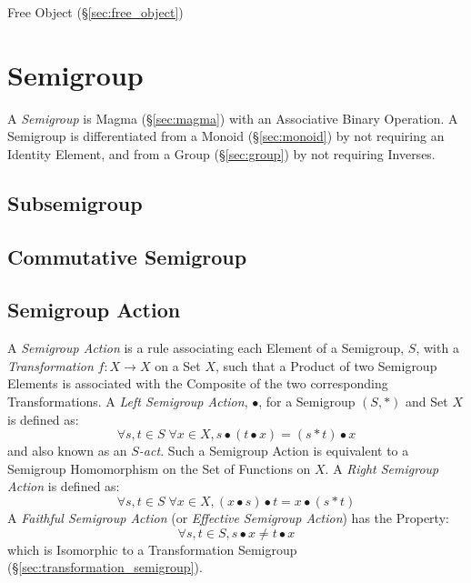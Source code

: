 Free Object (\S\ref{sec:free_object})



\section{Semigroup}\label{sec:semigroup}

A \emph{Semigroup} is Magma (\S\ref{sec:magma}) with an Associative
Binary Operation. A Semigroup is differentiated from a Monoid
(\S\ref{sec:monoid}) by not requiring an Identity Element, and from
a Group (\S\ref{sec:group}) by not requiring Inverses.



\subsection{Subsemigroup}\label{sec:subsemigroup}

\subsection{Commutative Semigroup}\label{sec:commutative_semigroup}

\subsection{Semigroup Action}\label{sec:semigroup_action}

A \emph{Semigroup Action} is a rule associating each Element of a
Semigroup, $S$, with a \emph{Transformation} $f : X \rightarrow X$ on
a Set $X$, such that a Product of two Semigroup Elements is associated
with the Composite of the two corresponding Transformations. A
\emph{Left Semigroup Action}, $\bullet$, for a Semigroup $(S,*)$ and
Set $X$ is defined as:
\[
  \forall s,t \in S\;\forall x \in X, s \bullet (t \bullet x) = (s * t)
  \bullet x
\]
and also known as an \emph{$S$-act}. Such a Semigroup Action is
equivalent to a Semigroup Homomorphism on the Set of Functions on $X$.
A \emph{Right Semigroup Action} is defined as:
\[
  \forall s,t \in S\;\forall x \in X, (x \bullet s) \bullet t = x
  \bullet (s * t)
\]
A \emph{Faithful Semigroup Action} (or \emph{Effective Semigroup
  Action}) has the Property:
\[
  \forall s, t \in S, s \bullet x \neq t \bullet x
\]
which is Isomorphic to a Transformation Semigroup
(\S\ref{sec:transformation_semigroup}).



